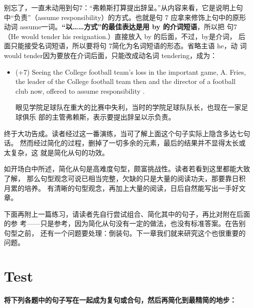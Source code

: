 别忘了，一直未动用到句7：“弗赖斯打算提出辞呈。”从内容来看，它是说明上句
中“负责”（assume responsibility）的方式。也就是句 7 应拿来修饰上句中的原形
动词 assume一词。\textbf{“以……方式”的最佳表达是用 by 的介词短语}，所以把
句7（He would tender his resignation.）直接放入 by 的后面，不过，by是介词，
后面只能接受名词短语，所以要将句 7简化为名词短语的形态。省略主语 he，动
词 would tender因为要放在介词后面，只能改成动名词 tendering，成为：
\begin{itemize}
\item (+7) Seeing the College football team's loss in the important game, A.
  Fries, the leader of the College football team then and the director of a
  football club now, offered to assume responsibility .

  眼见学院足球队在重大的比赛中失利，当时的学院足球队队长，也现在一家足球俱乐
  部的主管弗赖斯，表示要提出辞呈以示负责。
\end{itemize}
终于大功告成。读者经过这一番演练，当可了解上面这个句子实际上隐含多达七句话。
然而经过简化的过程，删掉了一切多余的元素，最后的结果并不显得太长或太复杂，这
就是简化从句的功效。

如开场白中所述，简化从句是高难度句型，颇富挑战性。读者若看到这里都能大致了解，
那么句型观念可说已相当完整，欠缺的只是大量的阅读功夫，那要靠日积月累的培养。
有清晰的句型观念，再加上大量的阅读，日后自然能写出一手好文章。

下面再附上一篇练习，请读者先自行尝试组合、简化其中的句子，再比对附在后面的参
考——只是参考，因为简化从句没有一定的做法，也没有标准答案。在告别句型之前，
还有一个问题要处理：倒装句。下一章我们就来研究这个也很重要的问题。

\section{Test}

\paragraph{将下列各题中的句子写在一起成为复句或合句，然后再简化到最精简的地步：}

